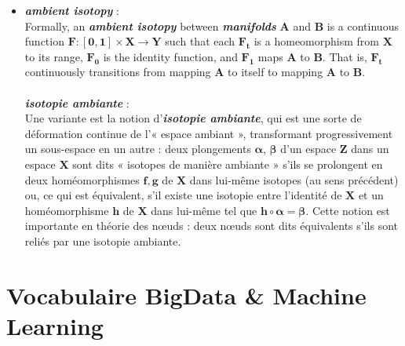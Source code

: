 \documentclass[french]{article}
\begin{document}
\begin{itemize}[label=\textbullet, font=\LARGE \color{blue}]
	\item \textbf{\textit{ambient isotopy}} : \\ Formally, an \textbf{\textit{ambient isotopy}} between \textbf{\textit{manifolds}} $\bm{A}$ and $\bm{B}$ is a continuous function $\bm{F:[0,1]\times X\rightarrow Y}$ such that each $\bm{F_{t}}$ is a homeomorphism from $\bm{X}$ to its range, $\bm{F_{0}}$ is the identity function, and $\bm{F_{1}}$ maps $\bm{A}$ to $\bm{B}$. That is, $\bm{F_{t}}$ continuously transitions from mapping $\bm{A}$ to itself to mapping  $\bm{A}$ to $\bm{B}$.\\ \\
	\textbf{\textit{isotopie ambiante}} :\\ 
	Une variante est la notion d'\textbf{\textit{isotopie ambiante}}, qui est une sorte de déformation continue de l'« espace ambiant », transformant progressivement un sous-espace en un autre : deux plongements $\bm{\alpha}$, $\bm{\beta}$ d'un espace $\bm{Z}$ dans un espace $\bm{X}$ sont dits « isotopes de manière ambiante » s'ils se prolongent en deux homéomorphismes $\bm{f, g}$ de $\bm{X}$ dans lui-même isotopes (au sens précédent) ou, ce qui est équivalent, s'il existe une isotopie entre l'identité de $\bm{X}$ et un homéomorphisme $\bm{h}$ de $\bm{X}$ dans lui-même tel que $\bm{h \circ \alpha=\beta}$. Cette notion est importante en théorie des nœuds : deux nœuds sont dits équivalents s'ils sont reliés par une isotopie ambiante.\\
\end{itemize}
	
\section{Vocabulaire BigData \& Machine Learning}
\end{document}
